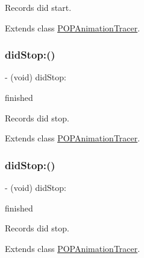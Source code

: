 Records did start. 

Extends class \mbox{\hyperlink{interface_p_o_p_animation_tracer_a91b472c0e05c912fe9d05e2e9de17f9f}{P\+O\+P\+Animation\+Tracer}}.

\mbox{\label{category_p_o_p_animation_tracer_07_internal_08_aa97d51350238303c671157f782583a9b}} 
\subsubsection{\texorpdfstring{did\+Stop\+:()}{didStop:()}\hspace{0.1cm}{\footnotesize\ttfamily [1/2]}}
{\footnotesize\ttfamily -\/ (void) did\+Stop\+: \begin{DoxyParamCaption}\item[{(B\+O\+OL)}]{finished }\end{DoxyParamCaption}}

Records did stop. 

Extends class \mbox{\hyperlink{interface_p_o_p_animation_tracer_aa97d51350238303c671157f782583a9b}{P\+O\+P\+Animation\+Tracer}}.

\mbox{\label{category_p_o_p_animation_tracer_07_internal_08_aa97d51350238303c671157f782583a9b}} 
\subsubsection{\texorpdfstring{did\+Stop\+:()}{didStop:()}\hspace{0.1cm}{\footnotesize\ttfamily [2/2]}}
{\footnotesize\ttfamily -\/ (void) did\+Stop\+: \begin{DoxyParamCaption}\item[{(B\+O\+OL)}]{finished }\end{DoxyParamCaption}}

Records did stop. 

Extends class \mbox{\hyperlink{interface_p_o_p_animation_tracer_aa97d51350238303c671157f782583a9b}{P\+O\+P\+Animation\+Tracer}}.

